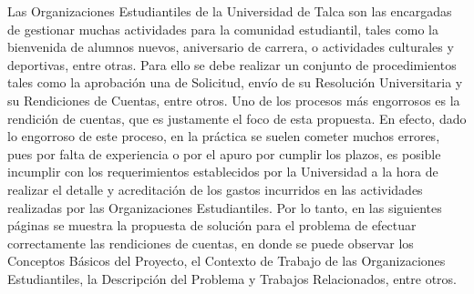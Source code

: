 Las Organizaciones Estudiantiles de la Universidad de Talca son las encargadas de gestionar muchas actividades para la comunidad estudiantil, tales como la bienvenida de alumnos nuevos, aniversario de carrera, o actividades culturales y deportivas, entre otras. Para ello se debe realizar un conjunto de procedimientos tales como la aprobación una de Solicitud, envío de su Resolución Universitaria y su Rendiciones de Cuentas, entre otros. Uno de los procesos más engorrosos es la rendición de cuentas, que es justamente el foco de esta propuesta. En efecto, dado lo engorroso de este proceso, en la práctica se suelen cometer muchos errores, pues por falta de experiencia o por el apuro por cumplir los plazos, es posible incumplir con los requerimientos establecidos por la Universidad a la hora de realizar el detalle y acreditación de los gastos incurridos en las actividades realizadas por las Organizaciones Estudiantiles. Por lo tanto, en las siguientes páginas se muestra la propuesta de solución para el problema de efectuar correctamente las rendiciones de cuentas, en donde se puede observar los Conceptos Básicos del Proyecto, el Contexto de Trabajo de las Organizaciones Estudiantiles, la Descripción del Problema y Trabajos Relacionados, entre otros.